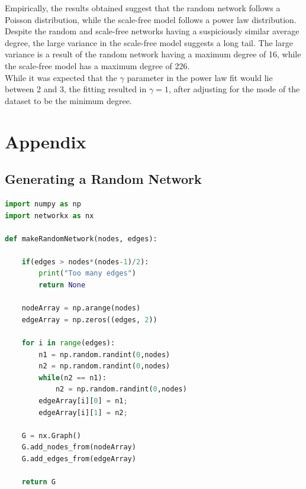 \documentclass[journal]{IEEEtran}
\begin{document}
\noindent Empirically, the results obtained suggest that the random network follows a Poisson distribution, while the scale-free model follows a power law distribution. Despite the random and scale-free networks having a suspiciously similar average degree, the large variance in the scale-free model suggests a long tail. The large variance is a result of the random network having a maximum degree of 16, while the scale-free model has a maximum degree of 226. \\

\noindent While it was expected that the $\gamma$ parameter in the power law fit would lie between 2 and 3, the fitting resulted in $\gamma = 1 $, after adjusting for the mode of the dataset to be the minimum degree. 











\printbibliography


\newpage
\onecolumn
\section{Appendix}

\subsection{Generating a Random Network}
\begin{lstlisting}[language=Python]
import numpy as np
import networkx as nx

def makeRandomNetwork(nodes, edges):

    if(edges > nodes*(nodes-1)/2):
        print("Too many edges")
        return None

    nodeArray = np.arange(nodes)
    edgeArray = np.zeros((edges, 2))

    for i in range(edges):
        n1 = np.random.randint(0,nodes)
        n2 = np.random.randint(0,nodes)
        while(n2 == n1):
            n2 = np.random.randint(0,nodes)
        edgeArray[i][0] = n1;
        edgeArray[i][1] = n2;

    G = nx.Graph()
    G.add_nodes_from(nodeArray)
    G.add_edges_from(edgeArray)

    return G
\end{lstlisting}
\end{document}
